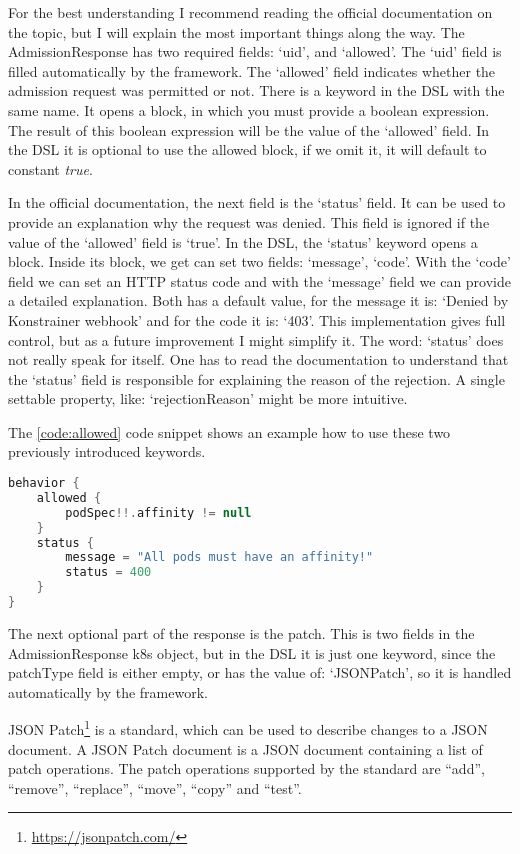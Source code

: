 For the best understanding I recommend reading the official documentation on the topic, but I will explain the most important things along the way. The AdmissionResponse has two required fields: `uid', and `allowed'. The `uid' field is filled automatically by the framework. The `allowed' field indicates whether the admission request was permitted or not. There is a keyword in the DSL with the same name. It opens a block, in which you must provide a boolean expression. The result of this boolean expression will be the value of the `allowed' field. In the DSL it is optional to use the allowed block, if we omit it, it will default to constant \emph{true}.

In the official documentation, the next field is the `status' field. It can be used to provide an explanation why the request was denied. This field is ignored if the value of the `allowed' field is `true'. In the DSL, the `status' keyword opens a block. Inside its block, we get can set two fields: `message', `code'. With the `code' field we can set an HTTP status code and with the `message' field we can provide a detailed explanation. Both has a default value, for the message it is: `Denied by Konstrainer webhook' and for the code it is: `403'. This implementation gives full control, but as a future improvement I might simplify it. The word: `status' does not really speak for itself. One has to read the documentation to understand that the `status' field is responsible for explaining the reason of the rejection. A single settable property, like: `rejectionReason' might be more intuitive.

The \ref{code:allowed} code snippet shows an example how to use these two previously introduced keywords.

\begin{lstlisting}[caption={Allowed and status},language=Kotlin,label=code:allowed]
behavior {
    allowed {
        podSpec!!.affinity != null
    }
    status {
        message = "All pods must have an affinity!"
        status = 400
    }
}
\end{lstlisting}

The next optional part of the response is the patch. This is two fields in the AdmissionResponse k8s object, but in the DSL it is just one keyword, since the patchType field is either empty, or has the value of: `JSONPatch', so it is handled automatically by the framework. 

JSON Patch\footnote{\url{https://jsonpatch.com/}} is a standard, which can be used to describe changes to a JSON document. A JSON Patch document is a JSON document containing a list of patch operations. The patch operations supported by the standard are “add”, “remove”, “replace”, “move”, “copy” and “test”.


